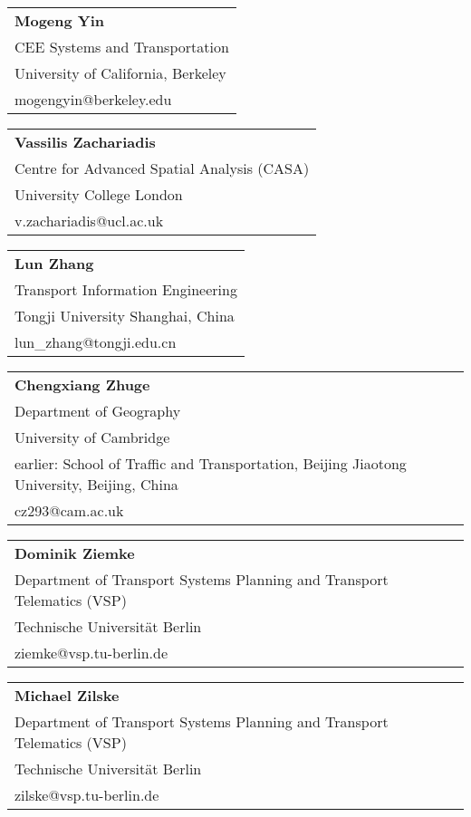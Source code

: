 \begin{tabular}[width=0.48\textwidth]{@{}l}
\textbf{Mogeng Yin} \\
CEE Systems and Transportation \\
University of California, Berkeley \\
mogengyin@berkeley.edu \\
\end{tabular}

\begin{tabular}[width=0.48\textwidth]{@{}l}
\textbf{Vassilis Zachariadis} \\
Centre for Advanced Spatial Analysis (CASA) \\
University College London \\
v.zachariadis@ucl.ac.uk \\
\end{tabular}

\begin{tabular}[width=0.48\textwidth]{@{}l}
\textbf{Lun Zhang} \\
Transport Information Engineering \\
Tongji University Shanghai, China \\
lun\_zhang@tongji.edu.cn \\
\end{tabular}

\begin{tabular}[width=0.48\textwidth]{@{}l}
\textbf{Chengxiang Zhuge} \\
Department of Geography \\
University of Cambridge\\
earlier: School of Traffic and Transportation, Beijing Jiaotong University, Beijing, China \\
cz293@cam.ac.uk \\
\end{tabular}

\begin{tabular}[width=0.48\textwidth]{@{}l}
\textbf{Dominik Ziemke} \\
Department of Transport Systems Planning and Transport Telematics (VSP) \\
Technische Universität Berlin \\
ziemke@vsp.tu-berlin.de \\
\end{tabular}

\begin{tabular}[width=0.48\textwidth]{@{}l}
\textbf{Michael Zilske} \\
Department of Transport Systems Planning and Transport Telematics (VSP) \\
Technische Universität Berlin \\
zilske@vsp.tu-berlin.de \\
\end{tabular}

